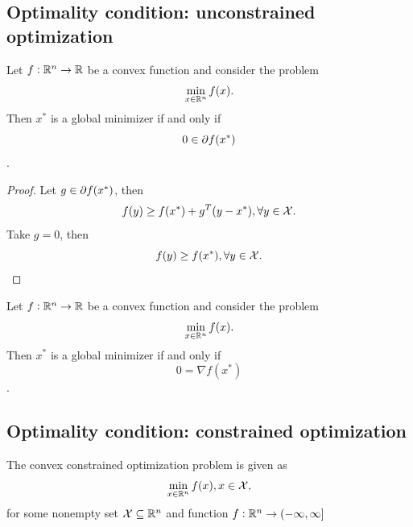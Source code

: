 \begin{refsection}
\subsection{Optimality condition: unconstrained optimization}
\begin{theorem}\label{ch:convex-optimization:th:optimalityconditionnonsmoothfunctionuncontrainedoptimization}
	Let $f:\mathbb{R}^n\to \mathbb{R}$ be a convex function and consider the problem
	$$\min_{x\in \mathbb{R}^n} f(x).$$
	Then $x^*$ is a global minimizer if and only if $$0\in \partial f(x^*)$$.
\end{theorem}
\begin{proof}
Let $g \in \partial f(x^*)$, then
$$f(y) \geq f(x^*) + g^T(y-x^*),\forall y\in \mathcal{X}.$$
Take $g = 0$, then
$$f(y) \geq f(x^*),\forall y\in \mathcal{X}.$$
\end{proof}

\begin{corollary}\label{ch:convex-optimization:th:optimalityconditiondifferentialfunctionuncontrainedoptimization}
	Let $f:\mathbb{R}^n\to \mathbb{R}$ be a convex function and consider the problem
	$$\min_{x\in \mathbb{R}^n} f(x).$$
	Then $x^*$ is a global minimizer if and only if $$0 = \nabla f(x^*)$$.
\end{corollary}






\subsection{Optimality condition: constrained optimization}
\begin{definition}
The convex constrained optimization problem is given as
$$\min_{x\in \mathbb{R}^n} f(x), x\in \mathcal{X},$$
for some nonempty set $\mathcal{X} \subseteq \mathbb{R}^n$ and function $f:\mathbb{R}^n \to (-\infty,\infty]$
\end{definition}



\end{refsection}
